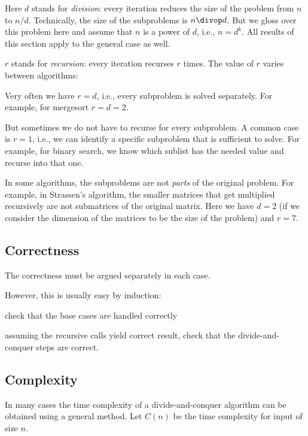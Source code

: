Here $d$ stands for \emph{division}: every iteration reduces the size of the problem from $n$ to $n/d$.
Technically, the size of the subproblems is $n \divop d$.
But we gloss over this problem here and assume that $n$ is a power of $d$, i.e., $n=d^k$.
All results of this section apply to the general case as well.

$r$ stands for \emph{recursion}: every iteration recurses $r$ times.
The value of $r$ varies between algorithms:
\begin{compactitem}
 \item Very often we have $r=d$, i.e., every subproblem is solved separately.
   For example, for mergesort $r=d=2$.
 \item But sometimes we do not have to recurse for every subproblem.
   A common case is $r=1$, i.e., we can identify a specific subproblem that is sufficient to solve.
   For example, for binary search, we know which sublist has the needed value and recurse into that one.
 \item In some algorithms, the subproblems are not \emph{parts} of the original problem.
   For example, in Strassen's algorithm, the smaller matrices that get multiplied recursively are not submatrices of the original matrix.
   Here we have $d=2$ (if we consider the dimension of the matrices to be the size of the problem) and $r=7$.
\end{compactitem}

\subsection{Correctness}

The correctness must be argued separately in each case.

However, this is usually easy by induction:
\begin{compactitem}
 \item check that the base cases are handled correctly
 \item assuming the recursive calls yield correct result, check that the divide-and-conquer steps are correct.
\end{compactitem}

\subsection{Complexity}

In many cases the time complexity of a divide-and-conquer algorithm can be obtained using a general method.
Let $C(n)$ be the time complexity for input of size $n$.

